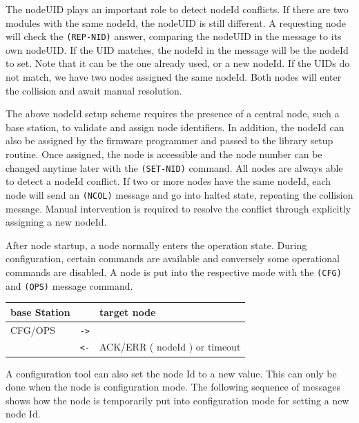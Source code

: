The nodeUID plays an important role to detect nodeId conflicts. If there are two modules with the same nodeId, the nodeUID is still different. A requesting node will check the \texttt{(REP-NID)} answer, comparing the nodeUID in the message to its own nodeUID. If the UID matches, the nodeId in the message will be the nodeId to set. Note that it can be the one already used, or a new nodeId. If the UIDs do not match, we have two nodes assigned the same nodeId. Both nodes will enter the collision and await manual resolution.

The above nodeId setup scheme requires the presence of a central node, such a base station, to validate and assign node identifiers. In addition, the nodeId can also be assigned by the firmware programmer and passed to the library setup routine. Once assigned, the node is accessible and the node number can be changed anytime later with the \texttt{(SET-NID)} command. All nodes are always able to detect a nodeId conflict. If two or more nodes have the same nodeId, each node will send an \texttt{(NCOL)} message and go into halted state, repeating the collision message. Manual intervention is required to resolve the conflict through explicitly assigning a new nodeId.


After node startup, a node normally enters the operation state. During configuration, certain commands are available and conversely some operational commands are disabled. A node is put into the respective mode with the \texttt{(CFG)} and \texttt{(OPS)} message command.

\begin{table}[ht!]
    \begin{center}
        \begin{tabular}{|p{}| c |p{}|}
            \toprule
            \textbf{base Station} & & \textbf{target node} \\
            \midrule
            CFG/OPS & \texttt{->} & \\
            & \texttt{<-} & ACK/ERR ( nodeId ) or timeout \\
            \bottomrule
        \end{tabular}
    \end{center}
\end{table}


A configuration tool can also set the node Id to a new value. This can only be done when the node is configuration mode. The following sequence of messages shows how the node is temporarily put into configuration mode for setting a new node Id.

